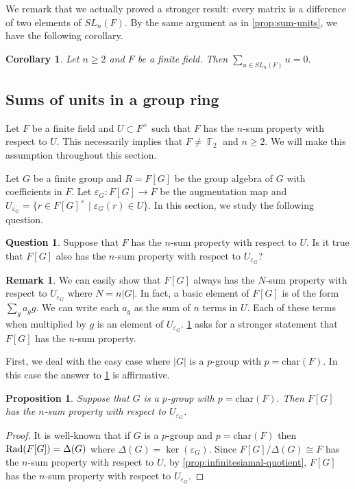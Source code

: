 \documentclass[11pt, a4paper]{amsart}
\newtheorem{prop}[thm]{Proposition}
\newtheorem{cor}[thm]{Corollary}
\theoremstyle{definition}
\newtheorem{question}[thm]{Question}
\newtheorem{rem}[thm]{Remark}
\DeclareMathOperator{\F}{\mathbb{F}}
\numberwithin{equation}{section}
\newcommand{\Rad}{{\rm Rad}}
\begin{document}
We remark that we actually proved a stronger result: every matrix is a difference of two elements of $SL_n(F)$.
By the same argument as in \cref{prop:sum-units}, we have the following corollary. 

\begin{cor}
Let $n \geq 2$ and $F$ be a finite field. Then 
    $\sum_{u \in SL_n(F)} u =0. $
\end{cor}
\subsection{Sums of units in a group ring}
Let $F$ be a finite field and $U \subset F^{\times}$ such that $F$ has the $n$-sum property with respect to $U.$ This necessarily implies that $F \neq \F_2$ and $n \geq 2$. We will make this assumption throughout this section. 


Let $G$ be a finite group and $R=F[G]$ be the group algebra of $G$ with coefficients in $F$. Let $\varepsilon_{G}\colon F[G] \to F$ be the augmentation map and $U_{\varepsilon_G}= \{r \in F[G]^{\times} \mid \varepsilon_G(r) \in U\}.$  In this section, we study the following question.

\begin{question} \label{question:F[G]}
  Suppose that $F$ has the $n$-sum property with respect to $U.$  Is it true that $F[G]$ also has the $n$-sum property with respect to $U_{\varepsilon_G}$? 
\end{question}
\begin{rem}
We can easily show that $F[G]$ always has the $N$-sum property with respect to $U_{\varepsilon_G}$ where $N= n|G|$.  In fact, a basic element of $F[G]$ is of the form $\sum_{g} a_g g.$ We can write each $a_g$ as the sum of $n$ terms in $U.$ Each of these terms when multiplied by $g$ is an element of $U_{\varepsilon_G}. $ \cref{question:F[G]} asks for a stronger statement that $F[G]$ has the $n$-sum property. 
\end{rem}

First, we deal with the easy case where $|G|$ is a $p$-group with $p =\text{char}(F)$. In this case the answer to \cref{question:F[G]} is affirmative. 
\begin{prop} \label{prop:p-group}
Suppose that $G$ is a $p$-group with $p = \text{char}(F).$ Then $F[G]$ has the $n$-sum property  with respect to $U_{\varepsilon_G}$. 
\end{prop}
\begin{proof}
    It is well-known that if $G$ is a $p$-group and $p=\text{char}(F)$ then $\Rad(F[G]) = \Delta(G)$ where $\Delta(G)=\ker(\varepsilon_{G}).$ Since $F[G]/\Delta(G) \cong F$ has the $n$-sum property with respect to $U$, by \cref{prop:infinitesiamal-quotient}, $F[G]$ has the $n$-sum property with respect to $U_{\varepsilon_{G}}.$
\end{proof}
\end{document}
